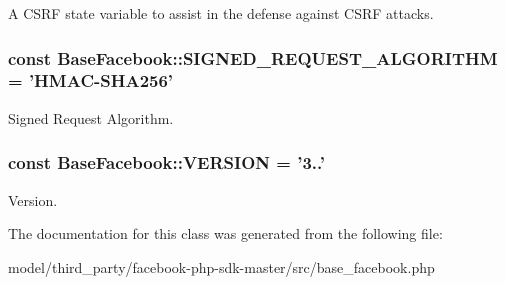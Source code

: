 A C\-S\-R\-F state variable to assist in the defense against C\-S\-R\-F attacks. \hypertarget{classBaseFacebook_a91b50b70a2d503d402d67ac8398d34b0}{
\subsubsection[{S\-I\-G\-N\-E\-D\-\_\-\-R\-E\-Q\-U\-E\-S\-T\-\_\-\-A\-L\-G\-O\-R\-I\-T\-H\-M}]{\setlength{\rightskip}{0pt plus 5cm}const Base\-Facebook\-::\-S\-I\-G\-N\-E\-D\-\_\-\-R\-E\-Q\-U\-E\-S\-T\-\_\-\-A\-L\-G\-O\-R\-I\-T\-H\-M = 'H\-M\-A\-C-\/S\-H\-A256'}}\label{classBaseFacebook_a91b50b70a2d503d402d67ac8398d34b0}
Signed Request Algorithm. \hypertarget{classBaseFacebook_ae0ee825ecd33e197a890c9b47ee14bd8}{
\subsubsection[{V\-E\-R\-S\-I\-O\-N}]{\setlength{\rightskip}{0pt plus 5cm}const Base\-Facebook\-::\-V\-E\-R\-S\-I\-O\-N = '3..'}}\label{classBaseFacebook_ae0ee825ecd33e197a890c9b47ee14bd8}
Version. 

The documentation for this class was generated from the following file\-:\begin{DoxyCompactItemize}
\item 
model/third\-\_\-party/facebook-\/php-\/sdk-\/master/src/base\-\_\-facebook.\-php\end{DoxyCompactItemize}
